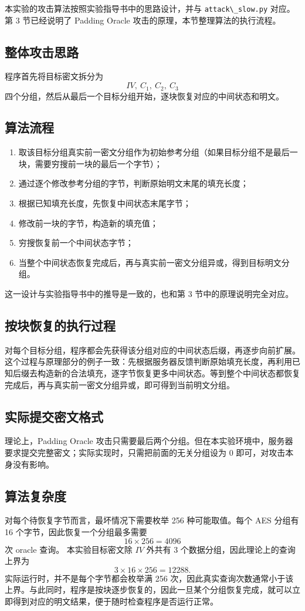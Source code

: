 本实验的攻击算法按照实验指导书中的思路设计，并与 \verb|attack\_slow.py| 对应。第 3 节已经说明了 Padding Oracle 攻击的原理，本节整理算法的执行流程。

\subsection{整体攻击思路}

程序首先将目标密文拆分为
\[
    IV,\ C_1,\ C_2,\ C_3
\]
四个分组，然后从最后一个目标分组开始，逐块恢复对应的中间状态和明文。

\subsection{算法流程}

\begin{enumerate}
    \item 取该目标分组真实前一密文分组作为初始参考分组（如果目标分组不是最后一块，需要穷搜前一块的最后一个字节）；
    \item 通过逐个修改参考分组的字节，判断原始明文末尾的填充长度；
    \item 根据已知填充长度，先恢复中间状态末尾字节；
    \item 修改前一块的字节，构造新的填充值；
    \item 穷搜恢复前一个中间状态字节；
    \item 当整个中间状态恢复完成后，再与真实前一密文分组异或，得到目标明文分组。
\end{enumerate}

这一设计与实验指导书中的推导是一致的，也和第 3 节中的原理说明完全对应。

\subsection{按块恢复的执行过程}

对每个目标分组，程序都会先获得该分组对应的中间状态后缀，再逐步向前扩展。这个过程与原理部分的例子一致：先根据服务器反馈判断原始填充长度，再利用已知后缀去构造新的合法填充，逐字节恢复更多中间状态。等到整个中间状态都恢复完成后，再与真实前一密文分组异或，即可得到当前明文分组。

\subsection{实际提交密文格式}

理论上，Padding Oracle 攻击只需要最后两个分组。但在本实验环境中，服务器要求提交完整密文；实际实现时，只需把前面的无关分组设为 0 即可，对攻击本身没有影响。

\subsection{算法复杂度}

对每个待恢复字节而言，最坏情况下需要枚举 256 种可能取值。每个 AES 分组有 16 个字节，因此恢复一个分组最多需要
\[
    16 \times 256 = 4096
\]
次 oracle 查询。
本实验目标密文除 $IV$ 外共有 3 个数据分组，因此理论上的查询上界为
\[
    3 \times 16 \times 256 = 12288.
\]
实际运行时，并不是每个字节都会枚举满 256 次，因此真实查询次数通常小于该上界。与此同时，程序是按块逐步恢复的，因此一旦某个分组恢复完成，就可以立即得到对应的明文结果，便于随时检查程序是否运行正常。
